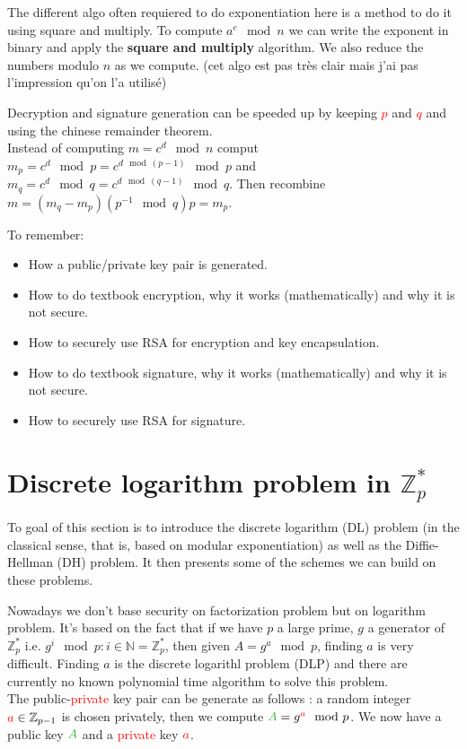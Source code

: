 \documentclass[11pt,a4paper]{report}
\newcommand{\tg}{\textcolor{ao}}
\newcommand{\tr}{\textcolor{red}}
\begin{document}
The different algo often requiered to do exponentiation here is a method to do it using square and multiply. To compute $a^e \mod n$ we can write the exponent in binary and apply the \textbf{square and multiply} algorithm. We also reduce the numbers modulo $n$ as we compute. (cet algo est pas très clair mais j'ai pas l'impression qu'on l'a utilisé)

Decryption and signature generation can be speeded up by keeping \textcolor{red}{$p$} and \textcolor{red}{$q$} and using the chinese remainder theorem.\\
Instead of computing $m = c^d \mod n$ comput $m_p = c^d \mod p = c^{d \mod (p-1)} \mod p$ and $m_q = c^d \mod q = c^{d \mod (q-1)} \mod q$. Then recombine $m = (m_q - m_p)(p^{-1} \mod q)p = m_p$.

To remember:
\begin{itemize}
\item How a public/private key pair is generated.
\item How to do textbook encryption, why it works (mathematically) and why it is not secure.
\item How to securely use RSA for encryption and key encapsulation.
\item How to do textbook signature, why it works (mathematically) and why it is not secure.
\item How to securely use RSA for signature.
\end{itemize}

\section{Discrete logarithm problem in $\mathbb{Z}_p^*$}
To goal of this section is to introduce the discrete logarithm (DL) problem (in the classical sense, that is, based on modular exponentiation) as well as the Diffie-Hellman (DH) problem. It then presents some of the schemes we can build on these problems.

Nowadays we don't base security on factorization problem but on logarithm problem. It's based on the fact that if we have $p$ a large prime, $g$ a generator of $\mathbb{Z}_p^*$ i.e. ${g^i \mod p : i \in \mathbb{N}} = \mathbb{Z}_p^*$, then given $A = g^a \mod p$, finding $a$ is very difficult. Finding $a$ is the discrete logarithl problem (DLP) and there are currently no known polynomial time algorithm to solve this problem.\\

The \textcolor{ao}{public}-\tr{private} key pair can be generate as follows : a random integer $\tr{a} \in \mathbb{Z}_{p-1}$ is chosen privately, then we compute $\tg{A} = g^{\tr{a}} \mod p$. We now have a \tg{public} key $\tg{A}$ and a \tr{private} key $\tr{a}$.\\
\end{document}
